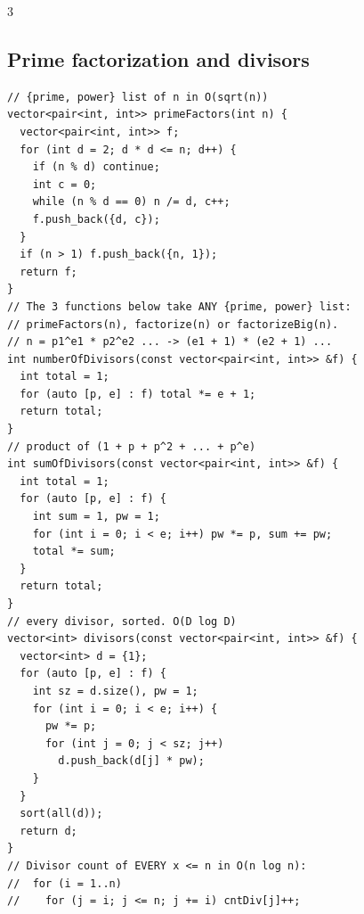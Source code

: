 \documentclass[8pt, a4paper]{article}
\begin{document}
\begin{multicols*}{3}
\subsection{Prime factorization and divisors}
\begin{lstlisting}
// {prime, power} list of n in O(sqrt(n))
vector<pair<int, int>> primeFactors(int n) {
  vector<pair<int, int>> f;
  for (int d = 2; d * d <= n; d++) {
    if (n % d) continue;
    int c = 0;
    while (n % d == 0) n /= d, c++;
    f.push_back({d, c});
  }
  if (n > 1) f.push_back({n, 1});
  return f;
}
// The 3 functions below take ANY {prime, power} list:
// primeFactors(n), factorize(n) or factorizeBig(n).
// n = p1^e1 * p2^e2 ... -> (e1 + 1) * (e2 + 1) ...
int numberOfDivisors(const vector<pair<int, int>> &f) {
  int total = 1;
  for (auto [p, e] : f) total *= e + 1;
  return total;
}
// product of (1 + p + p^2 + ... + p^e)
int sumOfDivisors(const vector<pair<int, int>> &f) {
  int total = 1;
  for (auto [p, e] : f) {
    int sum = 1, pw = 1;
    for (int i = 0; i < e; i++) pw *= p, sum += pw;
    total *= sum;
  }
  return total;
}
// every divisor, sorted. O(D log D)
vector<int> divisors(const vector<pair<int, int>> &f) {
  vector<int> d = {1};
  for (auto [p, e] : f) {
    int sz = d.size(), pw = 1;
    for (int i = 0; i < e; i++) {
      pw *= p;
      for (int j = 0; j < sz; j++)
        d.push_back(d[j] * pw);
    }
  }
  sort(all(d));
  return d;
}
// Divisor count of EVERY x <= n in O(n log n):
//  for (i = 1..n)
//    for (j = i; j <= n; j += i) cntDiv[j]++;
\end{lstlisting}

\end{multicols*}
\end{document}
